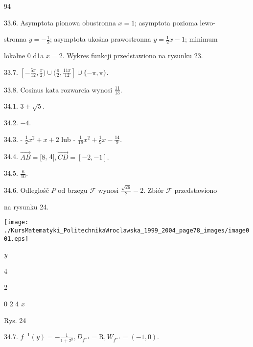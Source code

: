 \documentclass[a4paper,12pt]{article}
\begin{document}
94

33.6. Asymptota pionowa obustronna $x=1$; asymptota pozioma lewo-

stronna $y= -\displaystyle \frac{1}{2}$; asymptota ukośna prawostronna $y= \displaystyle \frac{1}{2}x-1$; minimum

lokalne 0 d1a $x=2$. Wykres funkcji przedstawiono na rysunku 23.

33.7. $[-\displaystyle \frac{5\pi}{12},\frac{\pi}{2})\cup(\frac{\pi}{2},\frac{11\pi}{12}]\cup\{-\pi,\pi\}.$

33.8. Cosinus kata rozwarcia wynosi $\displaystyle \frac{11}{13}.$

34.1. $3+\sqrt{5}.$

34.2. $-4.$

34.3. - $\displaystyle \frac{1}{2}x^{2}+x+2$ lub - $\displaystyle \frac{1}{18}x^{2}+\frac{1}{9}x-\frac{14}{9}.$

34.4. $\vec{AB}=[8$, 4$], \vec{CD}=[-2,-1].$

34.5. $\displaystyle \frac{6}{10}.$

34.6. Odleglośč $P$ od brzegu $\mathcal{F}$ wynosi $\displaystyle \frac{\sqrt{26}}{2}-2$. Zbiór $\mathcal{F}$ przedstawiono

na rysunku 24.
\begin{center}
\texttt{[image: ./KursMatematyki\_PolitechnikaWroclawska\_1999\_2004\_page78\_images/image001.eps]}
\end{center}
{\it y}

4

2

0 2  4  {\it x}

Rys. 24

34.7. $f^{-1}(y)=-\displaystyle \frac{1}{1+2^{y}}, D_{f^{-1}}=\mathrm{R}, W_{f^{-1}}=(-1,0).$
\end{document}
